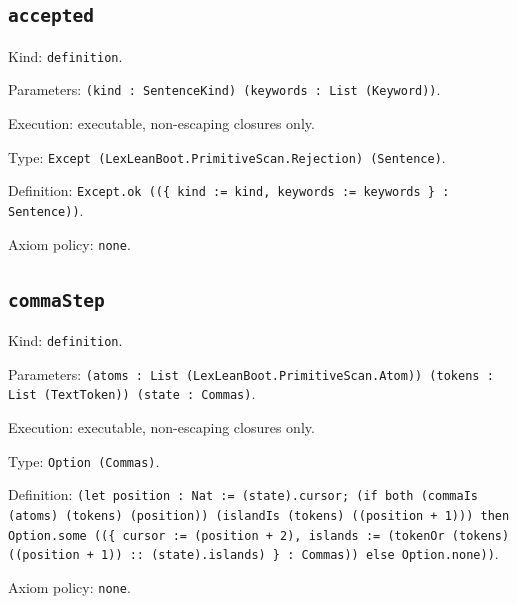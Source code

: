 \documentclass[11pt]{article}
\begin{document}
\subsection*{\texttt{accepted}}
\noindent Kind: \texttt{definition}.\par
\noindent Parameters: \texttt{(kind : SentenceKind) (keywords : List (Keyword))}.\par
\noindent Execution: executable, non-escaping closures only.\par
\noindent Type: \texttt{Except (LexLeanBoot.PrimitiveScan.Rejection) (Sentence)}.\par
\noindent Definition: \texttt{Except.ok ((\{ kind := kind, keywords := keywords \} : Sentence))}.\par
\noindent Axiom policy: \texttt{none}.\par
\subsection*{\texttt{commaStep}}
\noindent Kind: \texttt{definition}.\par
\noindent Parameters: \texttt{(atoms : List (LexLeanBoot.PrimitiveScan.Atom)) (tokens : List (TextToken)) (state : Commas)}.\par
\noindent Execution: executable, non-escaping closures only.\par
\noindent Type: \texttt{Option (Commas)}.\par
\noindent Definition: \texttt{(let position : Nat := (state).cursor; (if both (commaIs (atoms) (tokens) (position)) (islandIs (tokens) ((position + 1))) then Option.some ((\{ cursor := (position + 2), islands := (tokenOr (tokens) ((position + 1)) :: (state).islands) \} : Commas)) else Option.none))}.\par
\noindent Axiom policy: \texttt{none}.\par
\end{document}
